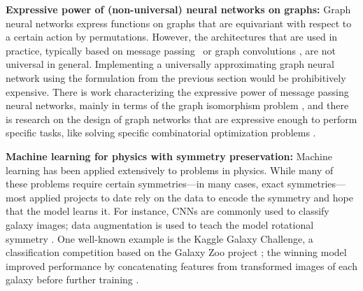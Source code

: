 \documentclass{article}
\renewcommand{\paragraph}[1]{\par\textbf{#1}}
\theoremstyle{Hogg}
\begin{document}
\paragraph{Expressive power of (non-universal) neural networks on graphs:} Graph neural networks express functions on graphs that are equivariant with respect to a certain action by permutations. However, the architectures that are used in practice, typically based on message passing~\cite{gilmer2017neural} or graph convolutions \cite{duvenaud2015convolutional, defferrard2016convolutional}, are not universal in general.
Implementing a universally approximating graph neural network using the formulation from the previous section would be prohibitively expensive.
There is work characterizing the expressive power of message passing neural networks, mainly in terms of the graph isomorphism problem \cite{xu2018powerful, morris2019higher, chen2019equivalence, loukas2019graph, tahmasebi2020counting, chen2020can}, and there is research on the design of graph networks that are expressive enough to perform specific tasks, like solving specific combinatorial optimization problems \cite{bengio2020machine, cappart2021combinatorial, nowak2017note, karalias2020erdos, yao2019experimental,joshi2019efficient, bouritsas2020improving}.

\paragraph{Machine learning for physics with symmetry preservation:}
Machine learning has been applied extensively to problems in physics.
While many of these problems require certain symmetries---in many cases, exact symmetries---most applied projects to date rely on the data to encode the symmetry and hope that the model learns it.
For instance, CNNs are commonly used to classify galaxy images; data augmentation is used to teach the model rotational symmetry \cite{huertas-company2015galaxy, aniyan2017radio, dominguez-sanchez2018galaxy, gonzalez2018augment}.
One well-known example is the Kaggle Galaxy Challenge, a classification competition based on the Galaxy Zoo project \cite{lintott2008gzoo}; the winning model improved performance by concatenating features from transformed images of each galaxy before further training \cite{dieleman2015gzoo}.
\end{document}
